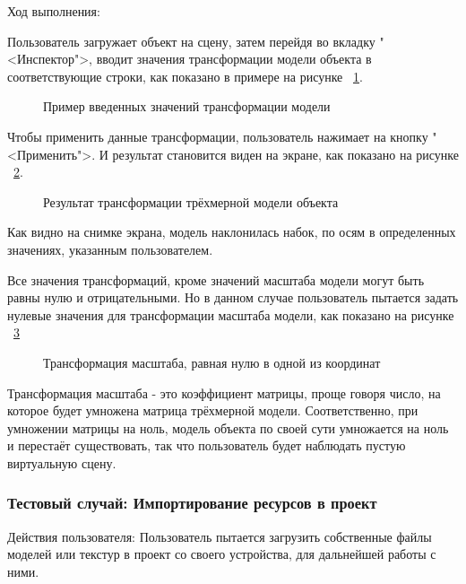 Ход выполнения:

Пользователь загружает объект на сцену, затем перейдя во вкладку "<Инспектор">, вводит значения трансформации модели объекта в соответствующие строки, как показано в примере на рисунке ~\ref{screen20:image}.

\begin{figure}[H]
	\caption{Пример введенных значений трансформации модели}
	\label{screen20:image}
\end{figure}

Чтобы применить данные трансформации, пользователь нажимает на кнопку "<Применить">. И результат становится виден на экране, как показано на рисунке ~\ref{screen21:image}.

\begin{figure}[H]
	\caption{Результат трансформации трёхмерной модели объекта}
	\label{screen21:image}
\end{figure}

Как видно на снимке экрана, модель наклонилась набок, по осям в определенных значениях, указанным пользователем.

Все значения трансформаций, кроме значений масштаба модели могут быть равны нулю и отрицательными. Но в данном случае пользователь пытается задать нулевые значения для трансформации масштаба модели, как показано на рисунке ~\ref{screen22:image}

\begin{figure}[H]
	\caption{Трансформация масштаба, равная нулю в одной из координат}
	\label{screen22:image}
\end{figure}

Трансформация масштаба - это коэффициент матрицы, проще говоря число, на которое будет умножена матрица трёхмерной модели. Соответственно, при умножении матрицы на ноль, модель объекта по своей сути умножается на ноль и перестаёт существовать, так что пользователь будет наблюдать пустую виртуальную сцену.

\subsubsection{Тестовый случай: Импортирование ресурсов в проект}
Действия пользователя: Пользователь пытается загрузить собственные файлы моделей или текстур в проект со своего устройства, для дальнейшей работы с ними.

